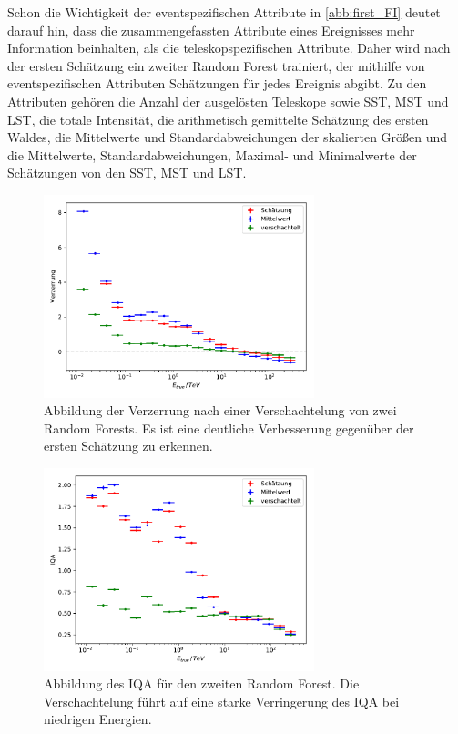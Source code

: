 Schon die Wichtigkeit der eventspezifischen Attribute in \autoref{abb:first_FI} deutet darauf hin, dass die zusammengefassten Attribute eines Ereignisses
mehr Information beinhalten, als die teleskopspezifischen Attribute.
Daher wird nach der ersten Schätzung ein zweiter Random Forest trainiert, der mithilfe von eventspezifischen Attributen Schätzungen für jedes Ereignis abgibt.
Zu den Attributen gehören die Anzahl der ausgelösten Teleskope sowie SST, MST und LST, die totale Intensität, die arithmetisch gemittelte Schätzung des
ersten Waldes, die Mittelwerte und Standardabweichungen der skalierten Größen und die Mittelwerte, Standardabweichungen, Maximal- und Minimalwerte der
Schätzungen von den SST, MST und LST.
\begin{figure}
  \includegraphics[width=0.7\textwidth]{Plots/RF_nested_bias.pdf}
  \centering
  \caption{Abbildung der Verzerrung nach einer Verschachtelung von zwei Random Forests. Es ist eine deutliche Verbesserung gegenüber der ersten Schätzung
            zu erkennen.}
  \label{abb:nest_bias}
\end{figure}
\begin{figure}
  \includegraphics[width=0.7\textwidth]{Plots/RF_nested_resolution.pdf}
  \centering
  \caption{Abbildung des IQA für den zweiten Random Forest. Die Verschachtelung führt auf eine starke Verringerung des IQA bei niedrigen Energien.}
  \label{abb:nest_IQA}
\end{figure}

